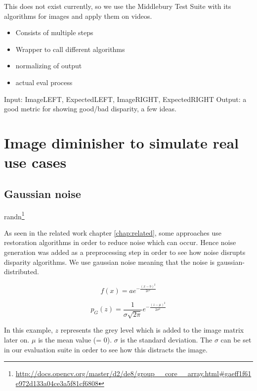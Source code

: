 This does not exist currently, so we use the Middlebury Test Suite with its algorithms for images and apply them on videos.

\begin{itemize}
	\item Consists of multiple steps
	\item Wrapper to call different algorithms
	\item normalizing of output
	\item actual eval process
\end{itemize}

Input: ImageLEFT, ExpectedLEFT, ImageRIGHT, ExpectedRIGHT
Output: a good metric for showing good/bad disparity, a few ideas.

\section{Image diminisher to simulate real use cases}

\subsection*{Gaussian noise}

randn\footnote{\url{http://docs.opencv.org/master/d2/de8/group__core__array.html\#gaeff1f61e972d133a04ce3a5f81cf6808}}


\citep{opencv_library}

As seen in the related work chapter \ref{chap:related}, some approaches use restoration algorithms in order to reduce noise which can occur.
Hence noise generation was added as a preprocessing step in order to see how noise disrupts disparity algorithms.
We use gaussian noise meaning that the noise is gaussian-distributed.

$$f\left(x\right) = a e^{- { \frac{(x-b)^2 }{ 2 c^2} } }$$

$$p_G(z) = \frac{1}{\sigma\sqrt{2\pi}} e^{ -\frac{(z-\mu)^2}{2\sigma^2} }$$

\noindent In this example, $z$ represents the grey level which is added to the image matrix later on.
$\mu$ is the mean value (= 0).
$\sigma$ is the standard deviation.
\newline\newline\noindent The $\sigma$ can be set in our evaluation suite in order to see how this distracts the image.


